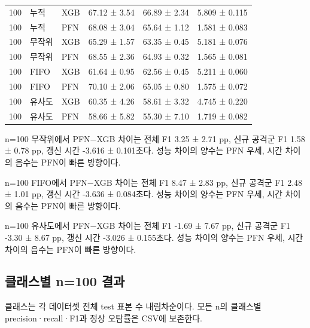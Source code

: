 \begin{longtable}
{}100 & 누적 & XGB & 67.12 ± 3.54 & 66.89 ± 2.34 & 5.809 ± 0.115 \\
{}100 & 누적 & PFN & 68.08 ± 3.04 & 65.64 ± 1.12 & 1.581 ± 0.083 \\
{}100 & 무작위 & XGB & 65.29 ± 1.57 & 63.35 ± 0.45 & 5.181 ± 0.076 \\
{}100 & 무작위 & PFN & 68.55 ± 2.36 & 64.93 ± 0.32 & 1.565 ± 0.081 \\
{}100 & FIFO & XGB & 61.64 ± 0.95 & 62.56 ± 0.45 & 5.211 ± 0.060 \\
{}100 & FIFO & PFN & 70.10 ± 2.06 & 65.05 ± 0.80 & 1.575 ± 0.072 \\
{}100 & 유사도 & XGB & 60.35 ± 4.26 & 58.61 ± 3.32 & 4.745 ± 0.220 \\
{}100 & 유사도 & PFN & 58.66 ± 5.82 & 55.30 ± 7.10 & 1.719 ± 0.082 \\
\bottomrule
\end{longtable}
\endgroup
n=\allowbreak{}100 무작위에서 PFN−XGB 차이는 전체 F1 3.25 ± 2.71 pp, 신규 공격군 F1 1.58 ± 0.78 pp, 갱신 시간 -3.616 ± 0.101초다. 성능 차이의 양수는 PFN 우세, 시간 차이의 음수는 PFN이 빠른 방향이다.

n=\allowbreak{}100 FIFO에서 PFN−XGB 차이는 전체 F1 8.47 ± 2.83 pp, 신규 공격군 F1 2.48 ± 1.01 pp, 갱신 시간 -3.636 ± 0.084초다. 성능 차이의 양수는 PFN 우세, 시간 차이의 음수는 PFN이 빠른 방향이다.

n=\allowbreak{}100 유사도에서 PFN−XGB 차이는 전체 F1 -1.69 ± 7.67 pp, 신규 공격군 F1 -3.30 ± 8.67 pp, 갱신 시간 -3.026 ± 0.155초다. 성능 차이의 양수는 PFN 우세, 시간 차이의 음수는 PFN이 빠른 방향이다.

\subsection{클래스별 n=\allowbreak{}100 결과}
클래스는 각 데이터셋 전체 test 표본 수 내림차순이다. 모든 n의 클래스별 precision·recall·F1과 정상 오탐률은 CSV에 보존한다.

